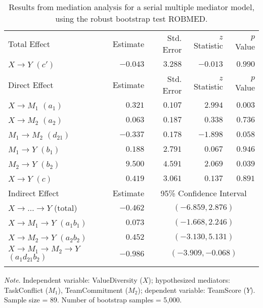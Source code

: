 \documentclass{article}\usepackage[]{graphicx}\usepackage[]{xcolor}
\begin{document}
\begin{table}[h!]
\caption{Results from mediation analysis for a serial multiple mediator model, using the robust bootstrap test ROBMED.}
\begin{center}
\begin{tabular}{lrrrr}
\hline\noalign{\smallskip}
Total Effect & Estimate & Std. Error & $z$ Statistic & $p$ Value \\ 
\noalign{\smallskip}\hline\noalign{\smallskip}
$X \rightarrow Y$ $(c')$ & $-0.043$ & $ 3.288$ & $-0.013$ & $ 0.990$ \\ 
\noalign{\smallskip}\hline\noalign{\smallskip}
Direct Effect & Estimate & Std. Error & $z$ Statistic & $p$ Value \\ 
\noalign{\smallskip}\hline\noalign{\smallskip}
$X \rightarrow M_{1}$ $(a_{1})$ & $ 0.321$ & $ 0.107$ & $ 2.994$ & $ 0.003$ \\ 
$X \rightarrow M_{2}$ $(a_{2})$ & $ 0.063$ & $ 0.187$ & $ 0.338$ & $ 0.736$ \\ 
$M_{1} \rightarrow M_{2}$ $(d_{21})$ & $-0.337$ & $ 0.178$ & $-1.898$ & $ 0.058$ \\ 
$M_{1} \rightarrow Y$ $(b_{1})$ & $ 0.188$ & $ 2.791$ & $ 0.067$ & $ 0.946$ \\ 
$M_{2} \rightarrow Y$ $(b_{2})$ & $ 9.500$ & $ 4.591$ & $ 2.069$ & $ 0.039$ \\ 
$X \rightarrow Y$ $(c)$ & $ 0.419$ & $ 3.061$ & $ 0.137$ & $ 0.891$ \\ 
\noalign{\smallskip}\hline\noalign{\smallskip}
Indirect Effect & Estimate & \multicolumn{3}{c}{95\% Confidence Interval} \\ 
\noalign{\smallskip}\hline\noalign{\smallskip}
$X \rightarrow  \ldots  \rightarrow Y$ (total) & $-0.462$ & \multicolumn{3}{c}{$(-6.859,  2.876)$} \\ 
$X \rightarrow M_{1} \rightarrow Y$ $(a_{1}b_{1})$ & $ 0.073$ & \multicolumn{3}{c}{$(-1.668,  2.246)$} \\ 
$X \rightarrow M_{2} \rightarrow Y$ $(a_{2}b_{2})$ & $ 0.452$ & \multicolumn{3}{c}{$(-3.130,  5.131)$} \\ 
$X \rightarrow M_{1} \rightarrow M_{2} \rightarrow Y$ $(a_{1}d_{21}b_{2})$ & $-0.986$ & \multicolumn{3}{c}{$(-3.909, -0.068)$} \\ 
\noalign{\smallskip}\hline
\end{tabular}
\end{center}
\emph{Note}. Independent variable: ValueDiversity ($X$); hypothesized mediators: TaskConflict ($M_{1}$), TeamCommitment ($M_{2}$); dependent variable: TeamScore ($Y$). Sample size = 89. Number of bootstrap samples = 5,000. 

\end{table}
\end{document}
